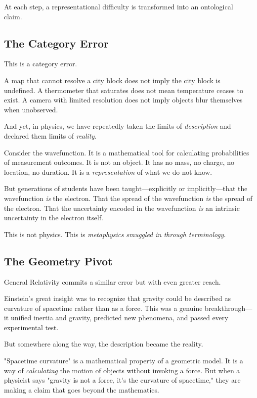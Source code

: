 \documentclass[12pt, a4paper]{article}
\begin{document}
At each step, a representational difficulty is transformed into an ontological claim.

\subsection{The Category Error}

This is a category error.

A map that cannot resolve a city block does not imply the city block is undefined. A thermometer that saturates does not mean temperature ceases to exist. A camera with limited resolution does not imply objects blur themselves when unobserved.

And yet, in physics, we have repeatedly taken the limits of \textit{description} and declared them limits of \textit{reality}.

Consider the wavefunction. It is a mathematical tool for calculating probabilities of measurement outcomes. It is not an object. It has no mass, no charge, no location, no duration. It is a \textit{representation} of what we do not know.

But generations of students have been taught—explicitly or implicitly—that the wavefunction \textit{is} the electron. That the spread of the wavefunction \textit{is} the spread of the electron. That the uncertainty encoded in the wavefunction \textit{is} an intrinsic uncertainty in the electron itself.

This is not physics. This is \textit{metaphysics smuggled in through terminology}.

\subsection{The Geometry Pivot}

General Relativity commits a similar error but with even greater reach.

Einstein's great insight was to recognize that gravity could be described as curvature of spacetime rather than as a force. This was a genuine breakthrough—it unified inertia and gravity, predicted new phenomena, and passed every experimental test.

But somewhere along the way, the description became the reality.

"Spacetime curvature" is a mathematical property of a geometric model. It is a way of \textit{calculating} the motion of objects without invoking a force. But when a physicist says "gravity is not a force, it's the curvature of spacetime," they are making a claim that goes beyond the mathematics.
\end{document}
